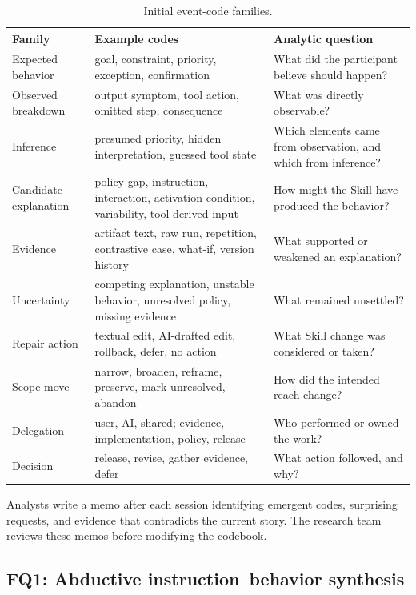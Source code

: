 \begin{table}[t]
\centering
\caption{Initial event-code families.}
\label{tab:first-cycle}
\begin{tabularx}{\textwidth}{P{0.18\textwidth}P{0.29\textwidth}Y}
\toprule
\textbf{Family} & \textbf{Example codes} & \textbf{Analytic question} \\
\midrule
Expected behavior & goal, constraint, priority, exception, confirmation & What did the participant believe should happen? \\
Observed breakdown & output symptom, tool action, omitted step, consequence & What was directly observable? \\
Inference & presumed priority, hidden interpretation, guessed tool state & Which elements came from observation, and which from inference? \\
Candidate explanation & policy gap, instruction, interaction, activation condition, variability, tool-derived input & How might the Skill have produced the behavior? \\
Evidence & artifact text, raw run, repetition, contrastive case, what-if, version history & What supported or weakened an explanation? \\
Uncertainty & competing explanation, unstable behavior, unresolved policy, missing evidence & What remained unsettled? \\
Repair action & textual edit, AI-drafted edit, rollback, defer, no action & What Skill change was considered or taken? \\
Scope move & narrow, broaden, reframe, preserve, mark unresolved, abandon & How did the intended reach change? \\
Delegation & user, AI, shared; evidence, implementation, policy, release & Who performed or owned the work? \\
Decision & release, revise, gather evidence, defer & What action followed, and why? \\
\bottomrule
\end{tabularx}
\end{table}

Analysts write a memo after each session identifying emergent codes, surprising
requests, and evidence that contradicts the current story. The research team
reviews these memos before modifying the codebook.

\subsection{FQ1: Abductive instruction--behavior synthesis}

